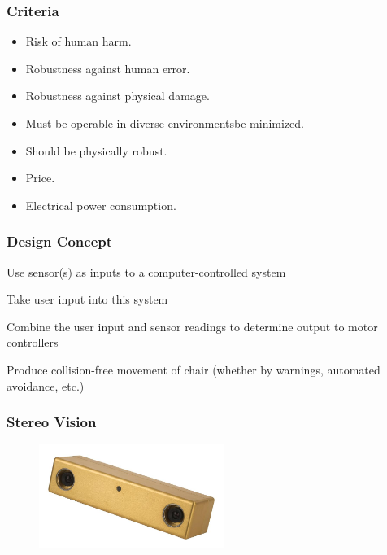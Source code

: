 \documentclass{beamer}
\begin{document}
\begin{frame}
  \frametitle{Criteria}
  \begin{itemize}
    \item Risk of human harm.\\
    \item Robustness against human error.\\
    \item Robustness against physical damage.\\
    \item Must be operable in diverse environmentsbe minimized. \\
    \item Should be physically robust. \\
    \item Price.\\
    \item Electrical power consumption.\\
  \end{itemize}
\end{frame}

\begin{frame}
  \frametitle{Design Concept}
  \item Use sensor(s) as inputs to a computer-controlled system
  \item Take user input into this system
  \item Combine the user input and sensor readings to determine output to motor controllers
  \item Produce collision-free movement of chair (whether by warnings, automated avoidance, etc.)
\end{frame}

\begin{frame}
  \frametitle{Stereo Vision}
  \begin{figure}
    \centering
    \includegraphics[width=6cm]{stereovision.jpg}
  \end{figure}
\end{frame}
\end{document}

